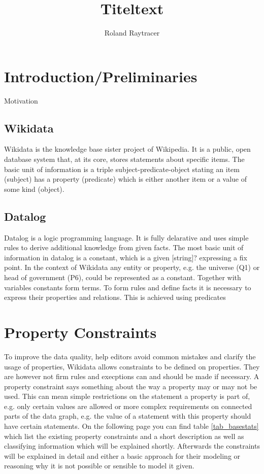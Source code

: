 \documentclass[hyperref,bachelorofscience]{cgvpub}
\author{Roland Raytracer}
\title{Titeltext}
\begin{document}
\chapter{Introduction/Preliminaries}
Motivation
\cite{test}
\section{Wikidata}
Wikidata is the knowledge base sister project of Wikipedia. It is a public, open database system that, at its core, stores statements about specific items. The basic unit of information is a triple subject-predicate-object stating an item (subject) has a property (predicate) which is either another item or a value of some kind (object). 
\section{Datalog}
Datalog is a logic programming language. It is fully delarative and uses simple rules to derive additional knowledge from given facts. The most basic unit of information in datalog is a constant, which is a given [string]? expressing a fix point. In the context of Wikidata any entity or property, e.g. the universe (Q1) or head of government (P6), could be represented as a constant. Together with variables constants form terms. To form rules and define facts it is necessary to express their properties and relations. This is achieved using predicates
\chapter{Property Constraints}
To improve the data quality, help editors avoid common mistakes and clarify the usage of properties, Wikidata allows constraints to be defined on properties. They are however not firm rules and execptions can and should be made if necessary. A property constraint says something about the way a property may or may not be used. This can mean simple restrictions on the statement a property is part of, e.g. only certain values are allowed or more complex requirements on connected parts of the data graph, e.g. the value of a statement with this property should have certain statements. On the following page you can find table \ref{tab_basestats} which list the existing property constraints and a short description as well as classifying information which will be explained shortly. Afterwards the constraints will be explained in detail and either a basic approach for their modeling or reasoning why it is not possible or sensible to model it given.\\
\end{document}
